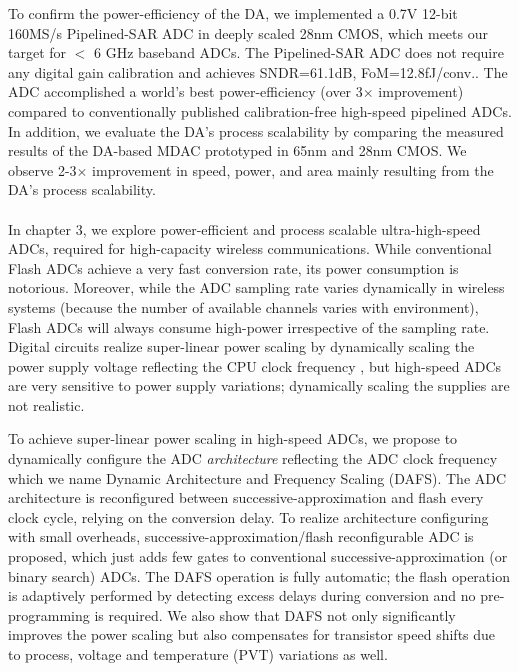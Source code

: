 To confirm the power-efficiency of the DA, we implemented a 0.7V 12-bit 160MS/s Pipelined-SAR ADC in deeply scaled 28nm CMOS, which meets our target for $<$ 6 GHz baseband ADCs.
The Pipelined-SAR ADC does not require any digital gain calibration and achieves SNDR=61.1dB, FoM=12.8fJ/conv.. The ADC accomplished a world's best power-efficiency (over 3$\times$ improvement) compared to conventionally published calibration-free high-speed pipelined ADCs. In addition, we evaluate the DA’s process scalability by comparing the measured results of the DA-based MDAC prototyped in 65nm and 28nm CMOS. We observe 2-3$\times$ improvement in speed, power, and area mainly resulting from the DA’s process scalability.
\\
\\
In chapter 3, we explore power-efficient and process scalable ultra-high-speed ADCs, required for high-capacity wireless communications.
While conventional Flash ADCs achieve a very fast conversion rate, its power consumption is notorious.
Moreover, while the ADC sampling rate varies dynamically in wireless systems (because the number of available channels varies with environment), Flash ADCs will always consume high-power irrespective of the sampling rate. Digital circuits realize super-linear power scaling by dynamically scaling the power supply voltage reflecting the CPU clock frequency \cite{DVFS}, but high-speed ADCs are very sensitive to power supply variations; dynamically scaling the supplies are not realistic.

To achieve super-linear power scaling in high-speed ADCs, we propose to dynamically configure the ADC \textit{architecture} reflecting the ADC clock frequency which we name Dynamic Architecture and Frequency Scaling (DAFS).
The ADC architecture is reconfigured between successive-approximation and flash every clock cycle, relying on the conversion delay. 
To realize architecture configuring with small overheads, successive-approximation/flash reconfigurable ADC is proposed, which just adds few gates to conventional successive-approximation (or binary search) ADCs. 
The DAFS operation is fully automatic; the flash operation is adaptively performed by detecting excess delays during conversion and no pre-programming is required. 
We also show that DAFS not only significantly improves the power scaling but also compensates for transistor speed shifts due to process, voltage and temperature (PVT) variations as well.

